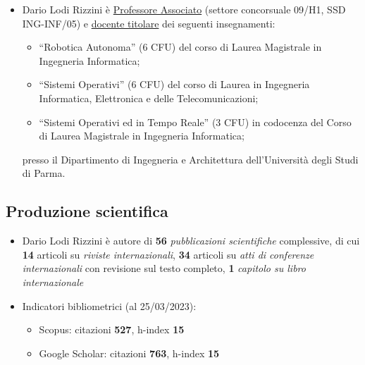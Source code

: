\documentclass[11pt]{article}
\begin{document}
\begin{itemize}
\item Dario Lodi Rizzini \`e \ul{Professore Associato} (settore concorsuale 09/H1, SSD ING-INF/05) 
e \ul{docente titolare} dei seguenti insegnamenti: 
%
\begin{itemize}
\item ``Robotica Autonoma'' (6 CFU) del corso di Laurea Magistrale in Ingegneria Informatica; 
\item ``Sistemi Operativi'' (6 CFU) del corso di Laurea in Ingegneria Informatica, Elettronica e delle Telecomunicazioni;
\item ``Sistemi Operativi ed in Tempo Reale'' (3 CFU) in codocenza del Corso di Laurea Magistrale in Ingegneria Informatica;
\end{itemize}
%
presso il Dipartimento di Ingegneria e Architettura dell'Universit\`a degli Studi di Parma. 
\end{itemize}


\subsection*{Produzione scientifica}

\begin{itemize}
\item Dario Lodi Rizzini \`e autore di \textbf{56} \emph{pubblicazioni scientifiche} complessive, di cui 
  \textbf{14} articoli su \emph{riviste internazionali}, 
  \textbf{34} articoli su \emph{atti di conferenze internazionali} con revisione sul testo completo,
  \textbf{1} \emph{capitolo su libro internazionale}

\item Indicatori bibliometrici (al 25/03/2023): 
  \begin{itemize}
  \item Scopus: citazioni \textbf{527}, h-index \textbf{15}
  \item Google Scholar: citazioni \textbf{763}, h-index \textbf{15}
  \end{itemize}
\end{itemize}
\end{document}
